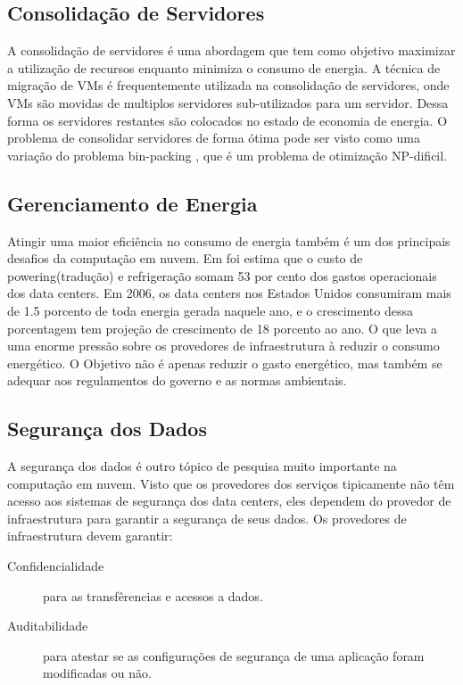 	\subsection{Consolidação de Servidores}
	A consolidação de servidores é uma abordagem que tem como objetivo maximizar a utilização de recursos enquanto minimiza o consumo de energia. A técnica de migração de VMs é frequentemente utilizada na consolidação de servidores, onde VMs são movidas de multiplos servidores sub-utilizados para um servidor. Dessa forma os servidores restantes são colocados no estado de economia de energia. O problema de consolidar servidores de forma ótima pode ser visto como uma variação do problema bin-packing \cite{Chekuri:1999}, que é um problema de otimização NP-dificil.
	
	\subsection{Gerenciamento de Energia}
	Atingir uma maior eficiência no consumo de energia também é um dos principais desafios da computação em nuvem. Em \cite{Hamilton} foi estima que o custo de powering(tradução) e refrigeração somam 53 por cento dos gastos operacionais dos data centers. Em 2006, os data centers nos Estados Unidos consumiram mais de 1.5 porcento de toda energia gerada naquele ano, e o crescimento dessa porcentagem tem projeção de crescimento de 18 porcento ao ano. O que leva a uma enorme pressão sobre os provedores de infraestrutura à reduzir o consumo energético. O Objetivo não é apenas reduzir o gasto energético, mas também se adequar aos regulamentos do governo e as normas ambientais. 
	
	\subsection{Segurança dos Dados}
	A segurança dos dados é outro tópico de pesquisa muito importante na computação em nuvem. Visto que os provedores dos serviços tipicamente não têm acesso aos sistemas de segurança dos data centers, eles dependem do provedor de infraestrutura para garantir a segurança de seus dados. Os provedores de infraestrutura devem garantir:
	\begin{description}
		\item[Confidencialidade] para as transfêrencias e acessos a dados.
		\item[Auditabilidade] para atestar se as configurações de segurança de uma aplicação foram modificadas ou não.  
	\end{description}	 
	
